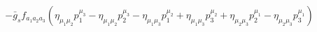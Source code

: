 %
\begin{dmath*}
%
  -  {\bar g}_sf_{a_1 a_2 a_3} \left(\eta_{\mu_1 \mu_2} p_1^{\mu_3} - \eta_{\mu_1 \mu_2} p_2^{\mu_3} - \eta_{\mu_1 \mu_3} p_1^{\mu_2} + \eta_{\mu_1 \mu_3} p_3^{\mu_2} + \eta_{\mu_2 \mu_3} p_2^{\mu_1} - \eta_{\mu_2 \mu_3} p_3^{\mu_1}\right)
%
\end{dmath*}
%

